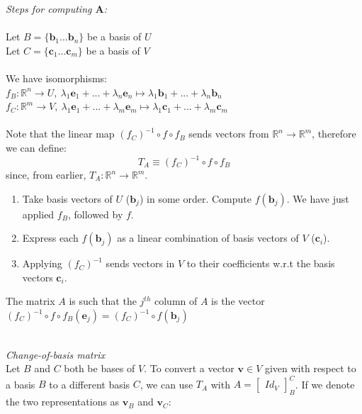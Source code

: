 \documentclass{scrartcl}
\newcommand{\R}{\mathbb{R}}
\renewcommand{\vec}[1]{\mathbf{#1}}
\begin{document}
\begin{tcolorbox}[breakable]
\textit{Steps for computing $ \vec{A} $:}
\\\\
Let $ B = \{\vec{b}_{1}...\vec{b}_{n}\} $ be a basis of $ U $
\\
Let $ C = \{\vec{c}_{1}...\vec{c}_{m}\} $ be a basis of $ V $
\\\\
We have isomorphisms:
\\
$ f_{B} : \R^{n} \to U, \ \lambda_{1}\vec{e}_{1} + ... + \lambda_{n}\vec{e}_{n} \mapsto \lambda_{1}\vec{b}_{1} + ... + \lambda_{n}\vec{b}_{n} $
\\
$ f_{C} : \R^{m} \to V, \ \lambda_{1}\vec{e}_{1} + ... + \lambda_{m}\vec{e}_{m} \mapsto \lambda_{1}\vec{c}_{1} + ... + \lambda_{m}\vec{c}_{m} $
\\\\
Note that the linear map $ (f_{C})^{-1} \circ f \circ f_{B} $ sends vectors from $ \R^{n} \to \R^{m} $, therefore we can define:
\begin{equation}
T_{A} \equiv (f_{C})^{-1} \circ f \circ f_{B}
\end{equation}
since, from earlier, $ T_{A} : \R^{n} \to \R^{m} $.
\begin{enumerate}[leftmargin=*]
\item Take basis vectors of $ U $ ($ \vec{b}_{j} $) in some order. Compute $ f(\vec{b}_{j}) $. We have just applied $ f_{B} $, followed by $ f $.
\item Express each $ f(\vec{b}_{j}) $ as a linear combination of basis vectors of $ V $ ($ \vec{c}_{i} $).
\item Applying $ (f_{C})^{-1} $ sends vectors in $ V $ to their coefficients w.r.t the basis vectors $ \vec{c}_{i} $.
\end{enumerate}
The matrix $ A $ is such that the $ j^{th} $ column of $ A $ is the vector $ (f_{C})^{-1} \circ f \circ f_{B}(\vec{e}_{j})  = (f_{C})^{-1} \circ f(\vec{b}_{j}) $
\end{tcolorbox}
\noindent
\\
\textit{Change-of-basis matrix}
\\
Let $ B $ and $ C $ both be bases of $ V $. To convert a vector $ \vec{v} \in V $ given with respect to a basis $ B $ to a different basis $ C $, we can use $ T_{A} $ with $ A = 
\begin{bmatrix}
Id_{V}
\end{bmatrix}_{B}^{C} $. If we denote the two representations as $ \vec{v}_{B} $ and $ \vec{v}_{C} $:
\end{document}
